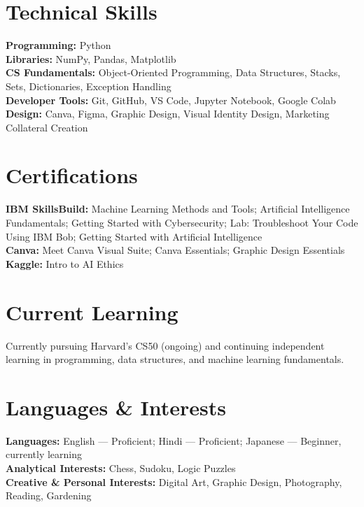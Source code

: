 \documentclass[10pt,a4paper]{article}
\begin{document}
\section{Technical Skills}
\begin{itemize}[leftmargin=0in, label={}]
  \small{\item{
    \textbf{\color{navy}Programming:} Python \\
    \textbf{\color{navy}Libraries:} NumPy, Pandas, Matplotlib \\
    \textbf{\color{navy}CS Fundamentals:} Object-Oriented Programming, Data Structures, Stacks, Sets, Dictionaries, Exception Handling \\
    \textbf{\color{navy}Developer Tools:} Git, GitHub, VS Code, Jupyter Notebook, Google Colab \\
    \textbf{\color{navy}Design:} Canva, Figma, Graphic Design, Visual Identity Design, Marketing Collateral Creation
  }}
\end{itemize}

\section{Certifications}
\begin{itemize}[leftmargin=0in, label={}]
  \small{\item{
    \textbf{\color{navy}IBM SkillsBuild:} Machine Learning Methods and Tools; Artificial Intelligence Fundamentals; Getting Started with Cybersecurity; Lab: Troubleshoot Your Code Using IBM Bob; Getting Started with Artificial Intelligence \\
    \textbf{\color{navy}Canva:} Meet Canva Visual Suite; Canva Essentials; Graphic Design Essentials \\
    \textbf{\color{navy}Kaggle:} Intro to AI Ethics
  }}
\end{itemize}

\section{Current Learning}
\small{Currently pursuing Harvard's CS50 (ongoing) and continuing independent learning in programming, data structures, and machine learning fundamentals.}

\section{Languages \& Interests}
\begin{itemize}[leftmargin=0in, label={}]
  \small{\item{
    \textbf{\color{navy}Languages:} English --- Proficient; Hindi --- Proficient; Japanese --- Beginner, currently learning \\
    \textbf{\color{navy}Analytical Interests:} Chess, Sudoku, Logic Puzzles \\
    \textbf{\color{navy}Creative \& Personal Interests:} Digital Art, Graphic Design, Photography, Reading, Gardening
  }}
\end{itemize}
\end{document}
